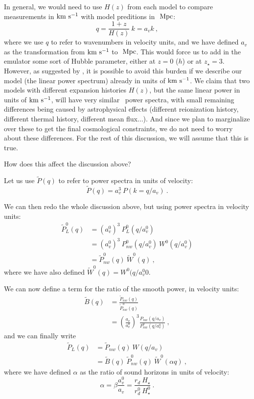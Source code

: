 In general, we would need to use $H(z)$ from each model to compare 
measurements in ${\rm km~s^{-1}}$ with model preditions in $\ \text{Mpc}$:
\begin{equation}
 q = \frac{1+z}{H(z)} ~ k = a_v k~,
\end{equation}
where we use $q$ to refer to wavenumbers in velocity units, and we have 
defined $a_v$ as the transformation from ${\rm km~s^{-1}}$ to $\ \text{Mpc}$.
This would force us to add in the emulator some sort of Hubble 
parameter, either at $z=0$ ($h$) or at $z_\star=3$. 
However, as suggested by \cite{McDonald2005a}, it is possible to avoid this
burden if we describe our model (the linear power spectrum) already in 
units of ${\rm km~s^{-1}}$.
We claim that two models with different expansion histories $H(z)$, but the
same linear power in units of ${\rm km~s^{-1}}$, will have very similar \lya\ power
spectra, with small remaining differences being caused by astrophysical 
effects (different reionization history, different thermal history, different
mean flux...). 
And since we plan to marginalize over these to get the final cosmological 
constraints, we do not need to worry about these differences. 
For the rest of this discussion, we will assume that this is true.

How does this affect the discussion above?

Let us use $\tilde P(q)$ to refer to power spectra in units of velocity:
\begin{equation}
 \tilde P(q) = a_v^3 ~ P(k= q / a_v) ~.
\end{equation}

We can then redo the whole discussion above, but using power spectra in 
velocity units:
\begin{align} 
 \tilde P^0_L(q) & = (a^0_v)^3 ~ P^0_L(q / a^0_v)         \nonumber \\
   & = (a^0_v)^3 ~ P^0_{nw}(q / a^0_v) ~ W^0(q / a^0_v)      \nonumber \\
   & = \tilde P^0_{nw}(q) ~ \tilde W^0(q)  ~,
\end{align}
where we have also defined $\tilde W^0(q) = W^0(q / a^0_v0$.

We can now define a term for the ratio of the smooth power, in velocity
units:
\begin{align}
 \tilde B(q) & = \frac{\tilde P_{nw}(q)}{\tilde P^0_{nw}(q)}    \nonumber \\
  & = \left(\frac{a_v}{a_v^0}\right)^3 
      \frac{P_{nw}(q / a_v)}{P^0_{nw}(q / a_v^0)} ~,
\end{align}
and we can finally write 
\begin{align}
 \tilde P_L(q) & = \tilde P_{nw}(q) ~ W(q / a_v)                \nonumber \\
  & = \tilde B(q) ~ \tilde P^0_{nw}(q) ~ \tilde W^0(\alpha q) ~,
\end{align}
where we have defined $\alpha$ as the ratio of sound horizons in units of 
velocity: 
\begin{equation}
 \alpha = \beta \frac{a_v^0}{a_v} = \frac{r_d ~ H_\star}{r_d^0 ~ H^0_\star}~.
\end{equation}

